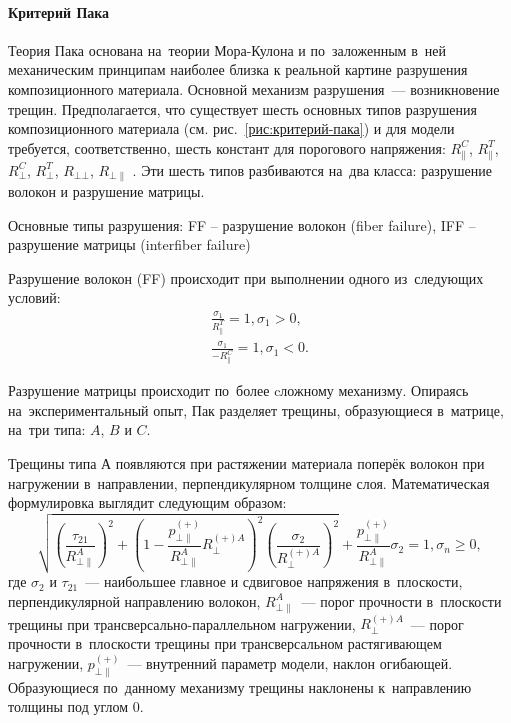 \documentclass[thesis.tex]{subfiles}
\begin{document}
\paragraph{Критерий Пака}
Теория Пака \cite{puck1969failure,puck2002failure} основана на~теории Мора-Кулона и по~заложенным в~ней механическим принципам наиболее близка
к реальной картине разрушения композиционного материала. Основной механизм разрушения~--- возникновение трещин.
Предполагается, что существует шесть основных типов разрушения композиционного материала (см. рис.~\ref{рис:критерий-пака})
и для модели требуется, соответственно, шесть констант для порогового напряжения: $R_{\|}^C$, $R_{\|}^T$,
$R_\bot^C$, $R_\bot^T$, $R_{\bot\bot}$, $R_{\bot\|}$ . Эти шесть типов разбиваются на~два класса: разрушение волокон и
разрушение матрицы.

    {Основные типы разрушения: FF – разрушение волокон (fiber failure), IFF – разрушение матрицы (interfiber failure)}

Разрушение волокон (FF) происходит при выполнении одного из~следующих условий:
\begin{align}
    \frac{\sigma_1}{R_{\|}^T} = 1, \sigma_1 > 0, \nonumber \\
    \frac{\sigma_1}{-R_{\|}^C} = 1, \sigma_1 < 0.
\end{align}

Разрушение матрицы происходит по~более cложному механизму. Опираясь на~экспериментальный опыт, Пак разделяет трещины,
образующиеся в~матрице, на~три типа: $A$, $B$ и $C$.

Трещины типа $А$ появляются при растяжении материала поперёк волокон при нагружении в~направлении, перпендикулярном
толщине слоя. Математическая формулировка выглядит следующим образом:
\begin{equation}
    \sqrt{\left( \frac{\tau_{21}}{R_{\bot\|}^A} \right)^2+
          \left( 1-\frac{p_{\bot\|}^{(+)}}{R_{\bot\|}^A}R_\bot^{(+)A} \right)^2
          \left( \frac{\sigma_2}{R_\bot^{(+)A}} \right)^2}+\frac{p_{\bot\|}^{(+)}}{R_{\bot\|}^A}\sigma_2=1,
    \sigma_n \geq 0,
\end{equation}
где $\sigma_2$ и $\tau_{21}$~--- наибольшее главное и сдвиговое напряжения в~плоскости, перпендикулярной направлению
волокон, $R_{\bot\|}^A$~--- порог прочности в~плоскости трещины при трансверсально-параллельном нагружении,
$R_\bot^{(+)A}$~--- порог прочности в~плоскости трещины при трансверсальном растягивающем нагружении,
$p_{\bot\|}^{(+)}$~--- внутренний параметр модели, наклон огибающей. Образующиеся по~данному механизму трещины
наклонены к~направлению толщины под углом 0\degree .
\end{document}

